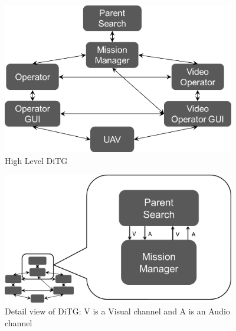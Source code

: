 
\begin{figure}[h]
\center
\includegraphics[width=4in]{ditg.png}
\caption{High Level DiTG}
\label{fig:ditg}
\end{figure}

\begin{figure}[h]
\center
\includegraphics[width=4in]{ditg_detailed.png}
\caption{Detail view of DiTG: V is a Visual channel and A is an Audio channel}
\label{fig:ditg_detail}
\end{figure}


